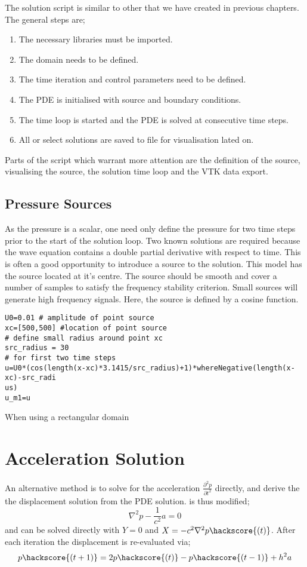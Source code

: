 The solution script is similar to other that we have created in previous
chapters. The general steps are;
\begin{enumerate}
 \item The necessary libraries must be imported.
 \item The domain needs to be defined.
 \item The time iteration and control parameters need to be defined.
 \item The PDE is initialised with source and boundary conditions.
 \item The time loop is started and the PDE is solved at consecutive time steps.
 \item All or select solutions are saved to file for visualisation lated on.
\end{enumerate}

Parts of the script which warrant more attention are the definition of the
source, visualising the source, the solution time loop and the VTK data export.

\subsection{Pressure Sources}
As the pressure is a scalar, one need only define the pressure for two 
time steps prior to the start of the solution loop. Two known solutions are
required because the wave equation contains a double partial derivative with
respect to time. This is often a good opportunity to introduce a source to the
solution. This model has the source located at it's centre. The source should
be smooth and cover a number of samples to satisfy the frequency stability
criterion. Small sources will generate high frequency signals. Here, the source
is defined by a cosine function.
\begin{verbatim}
U0=0.01 # amplitude of point source
xc=[500,500] #location of point source
# define small radius around point xc
src_radius = 30
# for first two time steps
u=U0*(cos(length(x-xc)*3.1415/src_radius)+1)*whereNegative(length(x-xc)-src_radi
us)
u_m1=u
\end{verbatim}
When using a rectangular domain

\section{Acceleration Solution}

An alternative method is to solve for the acceleration $\frac{\partial ^2
p}{\partial t^2}$ directly, and derive the the displacement solution from the
PDE solution.  is thus modified;
\begin{equation}
  \nabla ^2 p - \frac{1}{c^2} a = 0
\label{eqn:wavea}
\end{equation}
and can be solved directly with $Y=0$ and $X=-c^2 \nabla ^2 p\hackscore{(t)}$.
After each iteration the displacement is re-evaluated via;
\begin{equation}
 p\hackscore{(t+1)}=2p\hackscore{(t)} - p\hackscore{(t-1)} + h^2a
\end{equation}

